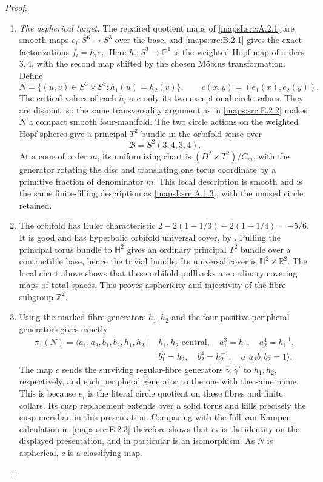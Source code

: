 \begin{proof}
\begin{enumerate}[label=\arabic*.,leftmargin=*]
\item \emph{The aspherical target.}
The repaired quotient maps of \cref{mapsI:src:A.2.1} are smooth maps
$e_i:S^6\to S^3$ over the base, and \ref{maps:src:B.2.1} gives the exact
factorizations $f_i=h_i e_i$. Here $h_i:S^3\to\mathbb P^1$
is the weighted Hopf map of orders $3,4$, with the second
map shifted by the chosen M\"obius transformation. Define
\[
 N=\{(u,v)\in S^3\times S^3:h_1(u)=h_2(v)\},\qquad
 c(x,y)=(e_1(x),e_2(y)).
 \tag{E.B5}\label{maps:eq:E.B5}
\]
The critical values of each $h_i$ are only its two exceptional
circle values. They are disjoint, so the same transversality
argument as in \ref{maps:src:E.2.2} makes $N$ a compact smooth four-manifold.
The two circle actions on the weighted Hopf spheres give a
principal $T^2$ bundle in the orbifold sense over
\[
                  \mathcal B=S^2(3,4,3,4).
\]
At a cone of order $m$, its uniformizing chart is
$(D^2\times T^2)/C_m$, with the generator rotating the disc
and translating one torus coordinate by a primitive fraction
of denominator $m$. This local description is smooth and is
the same finite-filling description as \cref{mapsI:src:A.1.3}, with the unused
circle retained.

\item The orbifold has Euler characteristic
$2-2(1-1/3)-2(1-1/4)=-5/6$. It is good and has hyperbolic
orbifold universal cover, by
\cite[Theorems 2.3--2.4 and the Euler-number discussion in
Section 2]{rootScott83}. Pulling the principal torus bundle to
$\mathbb H^2$ gives an ordinary principal $T^2$ bundle over a
contractible base, hence the trivial bundle. Its universal
cover is $\mathbb H^2\times\mathbb R^2$. The local chart above
shows that these orbifold pullbacks are ordinary covering maps
of total spaces. This proves asphericity and injectivity of
the fibre subgroup $\mathbb Z^2$.

\item Using the marked fibre generators $h_1,h_2$ and the four
positive peripheral generators gives exactly
\[
 \begin{split}
 \pi_1(N)=\langle a_1,a_2,b_1,b_2,h_1,h_2\mid {}&h_1,h_2
       \text{ central},\quad a_1^3=h_1,\quad a_2^4=h_1^{-1},\\
 &b_1^3=h_2,\quad b_2^4=h_2^{-1},\quad
 a_1a_2b_1b_2=1\rangle.
 \end{split}
\]
The map $c$ sends the surviving regular-fibre generators
$\widehat\gamma,\widehat\gamma'$ to $h_1,h_2$, respectively,
and each peripheral generator to the one with the same name.
This is because $e_i$ is the literal circle quotient on these
fibres and finite collars. Its cusp replacement extends over
a solid torus and kills precisely the cusp meridian in this
presentation. Comparing with the full van Kampen calculation
in \ref{maps:src:E.2.3} therefore shows that $c_*$ is the identity on the
displayed presentation, and in particular is an isomorphism.
As $N$ is aspherical, $c$ is a classifying map.


\end{enumerate}
\end{proof}
